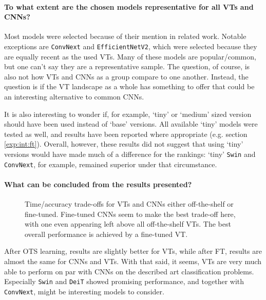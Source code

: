 
\paragraph{To what extent are the chosen models representative for all VTs and CNNs?}
Most models were selected because of their mention in related work. Notable exceptions are \texttt{ConvNext} and \texttt{EfficientNetV2}, which were selected because they are equally recent as the used VTs. Many of these models are popular/common, but one can't say they are a representative sample. The question, of course, is also not how VTs and CNNs as a group compare to one another. Instead, the question is if the VT landscape as a whole has something to offer that could be an interesting alternative to common CNNs.

It is also interesting to wonder if, for example, `tiny' or `medium' sized version should have been used instead of `base' versions. All available `tiny' models were tested as well, and results have been reported where appropriate (e.g. section \ref{exp:int:ft}). Overall, however, these results did not suggest that using `tiny' versions would have made much of a difference for the rankings: `tiny' \texttt{Swin} and \texttt{ConvNext}, for example, remained superior under that circumstance.

\paragraph{What can be concluded from the results presented?}

\begin{figure}[tbh]
    \centering
    \def\svgwidth{7.7cm}
    
    \caption{Time/accuracy trade-offs for VTs and CNNs either off-the-shelf or fine-tuned. Fine-tuned CNNs seem to make the best trade-off here, with one even appearing left above all off-the-shelf VTs. The best overall performance is achieved by a fine-tuned VT.}
    \label{results:img:ots_vs_ft_type}
\end{figure}

After OTS learning, results are slightly better for VTs, while after FT, results are almost the same for CNNs and VTs. With that said, it seems, VTs are very much able to perform on par with CNNs on the described art classification problems. Especially \texttt{Swin} and \texttt{DeiT} showed promising performance, and together with \texttt{ConvNext}, might be interesting models to consider.

